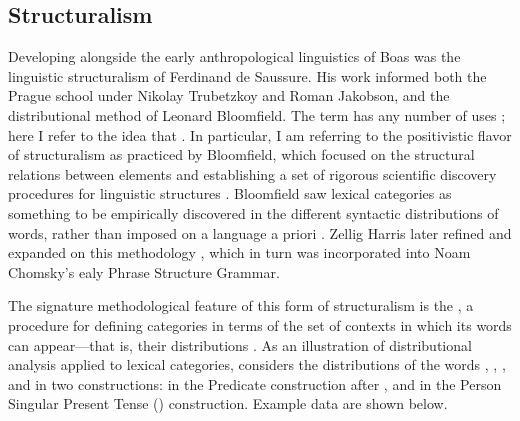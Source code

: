 \subsection{Structuralism}
\label{sec:2.2.3}

Developing alongside the early anthropological linguistics of Boas was the linguistic structuralism of Ferdinand de Saussure. His work informed both the Prague school under Nikolay Trubetzkoy and Roman Jakobson, and the distributional method of Leonard Bloomfield. The term  has any number of uses \parencite[Ch.~1]{Matthews2001}; here I refer to the idea that . In particular, I am referring to the positivistic flavor of structuralism as practiced by Bloomfield, which focused on the structural relations between elements and establishing a set of rigorous scientific discovery procedures for linguistic structures \parencite{Bloomfield1933}. Bloomfield saw lexical categories as something to be empirically discovered in the different syntactic distributions of words, rather than imposed on a language a priori \parencite[33]{Rauh2010}. Zellig Harris later refined and expanded on this methodology \parencite{Harris1951}, which in turn was incorporated into Noam Chomsky's ealy Phrase Structure Grammar.

The signature methodological feature of this form of structuralism is the , a procedure for defining categories in terms of the set of contexts in which its words can appear—that is, their distributions \parencites[5]{Harris1951}[11]{Croft2001b}. As an illustration of distributional analysis applied to lexical categories, \textcite[11--12]{Croft1991} considers the distributions of the  words , , , and  in two constructions: in the Predicate construction after , and in the  Person Singular Present Tense () construction. Example data are shown below.

\begin{exe}
  \ex\label{ex:2.2}
  \begin{xlist}
    \ex
      \begin{xlist}
        \setlength{\itemsep}{0em}
      \end{xlist}
    \ex
      \begin{xlist}
        \setlength{\itemsep}{0em}
      \end{xlist}
    \ex
      \begin{xlist}
        \setlength{\itemsep}{0em}
      \end{xlist}
    \ex
      \begin{xlist}
        \setlength{\itemsep}{0em}
      \end{xlist}
  \end{xlist}
\end{exe}

